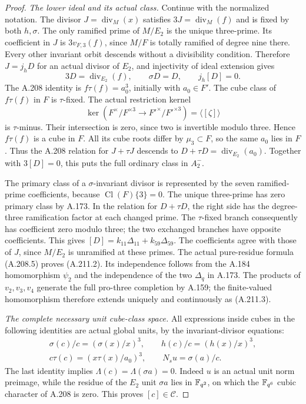 \begin{proof}
\emph{The lower ideal and its actual class.}
Continue with the normalized notation.  The divisor
\(J=\operatorname{div}_M(x)\) satisfies
\(3J=\operatorname{div}_M(f)\) and is fixed by both \(h,\sigma\).
The only ramified prime of \(M/E_2\) is the unique three-prime.
Its coefficient in \(J\) is \(3v_{F,3}(f)\), since
\(M/F\) is totally ramified of degree nine there.
Every other invariant orbit descends without a divisibility
condition.  Therefore \(J=j_hD\) for an actual divisor of \(E_2\),
and injectivity of ideal extension gives
\[
 3D=\operatorname{div}_{E_2}(f),\qquad
 \sigma D=D,\qquad j_h[D]=0.
\tag{A.211.13}
\]
The A.208 identity is \(f\tau(f)=a_0^3\), initially with \(a_0\in F'\).
The cube class of \(f\tau(f)\) in \(F\) is \(\tau\)-fixed.
The actual restriction kernel
\[
 \ker(F^\times/F^{\times3}\to F'^\times/F'^{\times3})
                     =\langle[\zeta]\rangle
\tag{A.211.14}
\]
is \(\tau\)-minus.  Their intersection is zero, since two is
invertible modulo three.  Hence \(f\tau(f)\) is a cube in \(F\).
All its cube roots differ by \(\mu_3\subset F\), so the same \(a_0\)
lies in \(F\).  Thus the A.208 relation for \(J+\tau J\) descends to
\(D+\tau D=\operatorname{div}_{E_2}(a_0)\).
Together with \(3[D]=0\), this puts the full ordinary class in \(A_2^-\).

The primary class of a \(\sigma\)-invariant divisor is represented
by the seven ramified-prime coefficients, because
\(\operatorname{Cl}(F)\{3\}=0\).  The unique three-prime has zero
primary class by A.173.  In the relation for \(D+\tau D\), the
right side has the degree-three ramification factor at each changed
prime.  The \(\tau\)-fixed branch consequently has coefficient zero
modulo three; the two exchanged branches have opposite coefficients.
This gives \([D]=k_{11}\Delta_{11}+k_{59}\Delta_{59}\).
The coefficients agree with those of \(J\), since \(M/E_2\) is
unramified at these primes.  The actual pure-residue formula
(A.208.5) proves (A.211.2).
Its independence follows from the A.184 homomorphism \(\psi_2\)
and the independence of the two \(\Delta_q\) in A.173.
The products of \(v_2,v_3,v_4\) generate the full pro-three completion
by A.159; the finite-valued homomorphism therefore extends uniquely
and continuously as (A.211.3).

\emph{The complete necessary unit cube-class space.}
All expressions inside cubes in the following identities are
actual global units, by the invariant-divisor equations:
\[
\begin{gathered}
 \sigma(c)/c=(\sigma(x)/x)^3,\qquad
 h(c)/c=(h(x)/x)^3,\\
 c\tau(c)=(x\tau(x)/a_0)^3,\qquad N_su=\sigma(a)/c.
\end{gathered}
\tag{A.211.15}
\]
The last identity implies \(\Lambda(c)=\Lambda(\sigma a)=0\).
Indeed \(u\) is an actual unit norm preimage, while the residue
of the \(E_2\) unit \(\sigma a\) lies in \(\mathbb F_{q^2}\), on which
the \(\mathbb F_{q^6}\) cubic character of A.208 is zero.
This proves \([c]\in\mathcal C\).


\end{proof}
